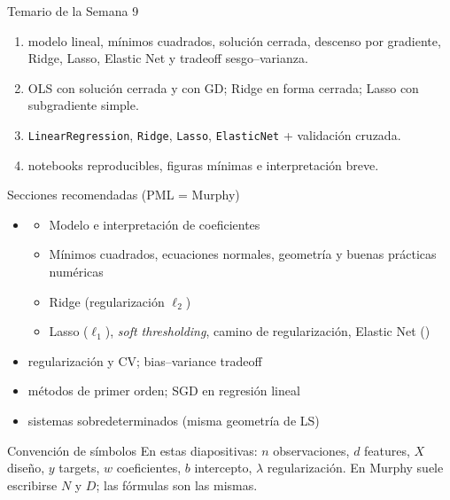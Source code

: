 \begin{frame}
  \titlepage
\end{frame}

\begin{frame}{Temario de la Semana 9}
\begin{enumerate}\small
  \item {} modelo lineal, mínimos cuadrados, solución cerrada, descenso por gradiente, Ridge, Lasso, Elastic Net y tradeoff sesgo--varianza.
  \item {} OLS con solución cerrada y con GD; Ridge en forma cerrada; Lasso con subgradiente simple.
  \item {} \texttt{LinearRegression}, \texttt{Ridge}, \texttt{Lasso}, \texttt{ElasticNet} + validación cruzada.
  \item {} notebooks reproducibles, figuras mínimas e interpretación breve.
\end{enumerate}
\end{frame}

\begin{frame}{Secciones recomendadas (PML = Murphy)}
\begin{itemize}\small
  \item {}
  \begin{itemize}\footnotesize
    \item {} Modelo e interpretación de coeficientes
    \item {} Mínimos cuadrados, ecuaciones normales, geometría y buenas prácticas numéricas
    \item {} Ridge (regularización $\ell_2$)
    \item {} Lasso ($\ell_1$), \emph{soft thresholding}, camino de regularización, Elastic Net ()
  \end{itemize}
  \item {}  regularización y CV;  bias--variance tradeoff
  \item {}  métodos de primer orden;  SGD en regresión lineal
  \item {}  sistemas sobredeterminados (misma geometría de LS)
\end{itemize}
\vspace{0.25em}
\begin{block}{Convención de símbolos}
\footnotesize
En estas diapositivas: $n$ observaciones, $d$ features, $X$ diseño, $y$ targets, $w$ coeficientes, $b$ intercepto, $\lambda$ regularización. En Murphy suele escribirse $N$ y $D$; las fórmulas son las mismas.
\end{block}
\end{frame}

